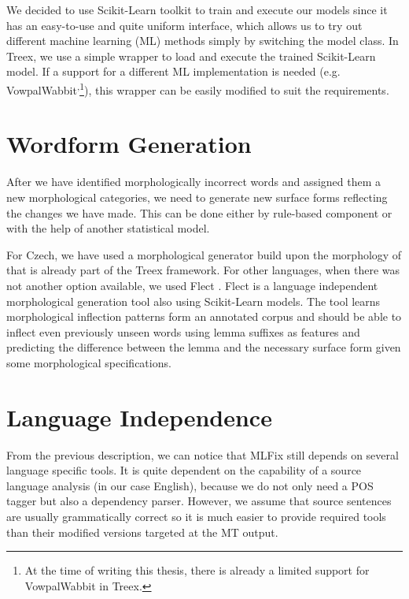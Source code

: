 We decided to use Scikit-Learn \citep{scikit-learn} toolkit to train and execute our models since
it has an easy-to-use and quite uniform interface, which allows us to try out different
machine learning (ML) methods simply by switching the model class. In Treex, we use a simple
wrapper to load and execute the trained Scikit-Learn model. If a support for a different ML implementation
is needed (e.g. VowpalWabbit\textsuperscript{,}\footnote{At the time of writing this thesis, there is already
a limited support for VowpalWabbit in Treex.}), this wrapper can be easily modified to suit the requirements.

\section{Wordform Generation}

After we have identified morphologically incorrect words and assigned
them a new morphological categories, we need to generate new surface forms reflecting
the changes we have made.
This can be done either by rule-based component or with
the help of another statistical model. 

For Czech, we have used a morphological generator build upon the morphology of \citet{HajicHAB2004}
that is already part of the Treex framework. For other languages,
when there was not another option available,
we used Flect \citep{DBLP:conf/acl/DusekJ13}.
Flect is a language independent morphological generation tool also using Scikit-Learn
models. The tool learns morphological inflection patterns form an annotated corpus and
should be able to inflect even previously unseen words using lemma suffixes as features
and predicting the difference between the lemma and the necessary surface form given some
morphological specifications.

\section{Language Independence}

From the previous description, we can notice that MLFix still depends on several
language specific tools. It is quite dependent on the capability of a source
language analysis (in our case English), because we do not only need a POS tagger but also a dependency
parser. However, we assume that source sentences are usually grammatically correct
so it is much easier to provide required tools than their modified versions
targeted at the MT output.

